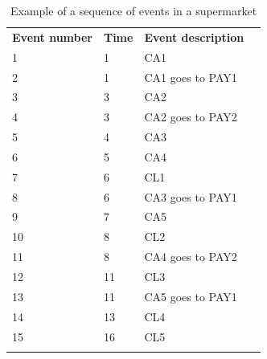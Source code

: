 \begin{table}[H]
\centering
\begin{tabular}{llll}
\cline{1-3}
\multicolumn{1}{|l|}{\cellcolor[HTML]{9B9B9B}\textbf{Event number}} & \multicolumn{1}{l|}{\cellcolor[HTML]{9B9B9B}\textbf{Time}} & \multicolumn{1}{l|}{\cellcolor[HTML]{9B9B9B}\textbf{Event description}} &  \\ \cline{1-3}
\multicolumn{1}{|l|}{1} & \multicolumn{1}{l|}{1} & \multicolumn{1}{l|}{CA1} &  \\ \cline{1-3}
\multicolumn{1}{|l|}{2} & \multicolumn{1}{l|}{1} & \multicolumn{1}{l|}{CA1 goes to PAY1} &  \\ \cline{1-3}
\multicolumn{1}{|l|}{3} & \multicolumn{1}{l|}{3} & \multicolumn{1}{l|}{CA2} &  \\ \cline{1-3}
\multicolumn{1}{|l|}{4} & \multicolumn{1}{l|}{3} & \multicolumn{1}{l|}{CA2 goes to PAY2} &  \\ \cline{1-3}
\multicolumn{1}{|l|}{5} & \multicolumn{1}{l|}{4} & \multicolumn{1}{l|}{CA3} &  \\ \cline{1-3}
\multicolumn{1}{|l|}{6} & \multicolumn{1}{l|}{5} & \multicolumn{1}{l|}{CA4} &  \\ \cline{1-3}
\multicolumn{1}{|l|}{7} & \multicolumn{1}{l|}{6} & \multicolumn{1}{l|}{CL1} &  \\ \cline{1-3}
\multicolumn{1}{|l|}{8} & \multicolumn{1}{l|}{6} & \multicolumn{1}{l|}{CA3 goes to PAY1} &  \\ \cline{1-3}
\multicolumn{1}{|l|}{9} & \multicolumn{1}{l|}{7} & \multicolumn{1}{l|}{CA5} &  \\ \cline{1-3}
\multicolumn{1}{|l|}{10} & \multicolumn{1}{l|}{8} & \multicolumn{1}{l|}{CL2} &  \\ \cline{1-3}
\multicolumn{1}{|l|}{11} & \multicolumn{1}{l|}{8} & \multicolumn{1}{l|}{CA4 goes to PAY2} &  \\ \cline{1-3}
\multicolumn{1}{|l|}{12} & \multicolumn{1}{l|}{11} & \multicolumn{1}{l|}{CL3} &  \\ \cline{1-3}
\multicolumn{1}{|l|}{13} & \multicolumn{1}{l|}{11} & \multicolumn{1}{l|}{CA5 goes to PAY1} &  \\ \cline{1-3}
\multicolumn{1}{|l|}{14} & \multicolumn{1}{l|}{13} & \multicolumn{1}{l|}{CL4} &  \\ \cline{1-3}
\multicolumn{1}{|l|}{15} & \multicolumn{1}{l|}{16} & \multicolumn{1}{l|}{CL5} &  \\ \cline{1-3}
 &  &  & 
\end{tabular}
\caption{Example of a sequence of events in a supermarket}
\label{tab_DESexample}
\end{table}

